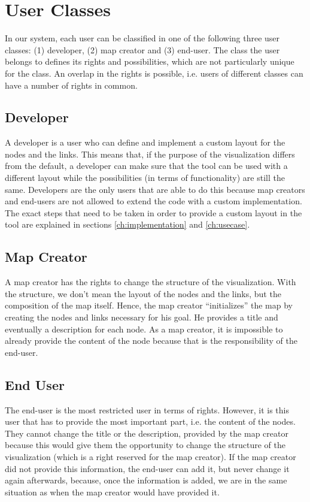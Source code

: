 \section{User Classes}\label{sec:user-classes}
In our system, each user can be classified in one of the following three user classes: (1) developer, (2) map creator and (3) end-user. The class the user belongs to defines its rights and possibilities, which are not particularly unique for the class. An overlap in the rights is possible, i.e. users of different classes can have a number of rights in common.

\subsection{Developer}\label{sec:user-class-developer}
A developer is a user who can define and implement a custom layout for the nodes and the links. This means that, if the purpose of the visualization differs from the default, a developer can make sure that the tool can be used with a different layout while the possibilities (in terms of functionality) are still the same. Developers are the only users that are able to do this because map creators and end-users are not allowed to extend the code with a custom implementation. The exact steps that need to be taken in order to provide a custom layout in the tool are explained in sections \ref{ch:implementation} and \ref{ch:usecase}.

\subsection{Map Creator}\label{sec:user-class-map-creator}
A map creator has the rights to change the structure of the visualization. With the structure, we don't mean the layout of the nodes and the links, but the composition of the map itself. Hence, the map creator ``initializes'' the map by creating the nodes and links necessary for his goal. He provides a title and eventually a description for each node. As a map creator, it is impossible to already provide the content of the node because that is the responsibility of the end-user. 

\subsection{End User}\label{sec:user-class-end-user}
The end-user is the most restricted user in terms of rights. However, it is this user that has to provide the most important part, i.e. the content of the nodes. They cannot change the title or the description, provided by the map creator because this would give them the opportunity to change the structure of the visualization (which is a right reserved for the map creator). If the map creator did not provide this information, the end-user can add it, but never change it again afterwards, because, once the information is added, we are in the same situation as when the map creator would have provided it.



